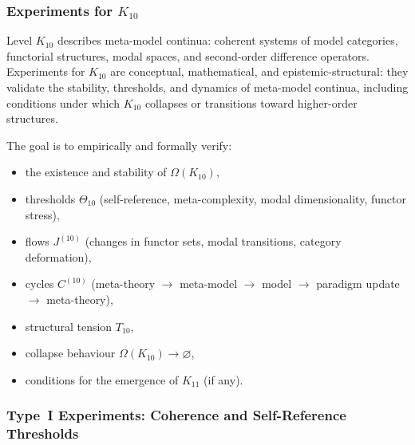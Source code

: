 
\subsubsection{Experiments for $K_{10}$}
\label{sec:experiments-k10}

Level $K_{10}$ describes meta-model continua: coherent systems of
model categories, functorial structures, modal spaces, and
second-order difference operators.
Experiments for $K_{10}$ are conceptual, mathematical, and
epistemic-structural: they validate the stability, thresholds,
and dynamics of meta-model continua, including conditions under which
$K_{10}$ collapses or transitions toward higher-order structures.

The goal is to empirically and formally verify:

\begin{itemize}
    \item the existence and stability of $\Omega(K_{10})$,
    \item thresholds $\Theta_{10}$ (self-reference, meta-complexity,
          modal dimensionality, functor stress),
    \item flows $J^{(10)}$ (changes in functor sets, modal transitions,
          category deformation),
    \item cycles $C^{(10)}$ (meta-theory $\to$ meta-model $\to$ model
          $\to$ paradigm update $\to$ meta-theory),
    \item structural tension $T_{10}$,
    \item collapse behaviour $\Omega(K_{10}) \to \varnothing$,
    \item conditions for the emergence of $K_{11}$ (if any).
\end{itemize}



\subsubsection{Type~I Experiments: Coherence and Self-Reference Thresholds}

